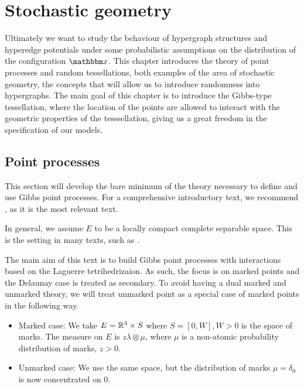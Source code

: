 \chapter{Stochastic geometry}
Ultimately we want to study the behaviour of hypergraph structures and hyperedge potentials under some probabilistic assumptions on the distribution of the configuration $\x$. This chapter introduces the theory of point processes and random tessellations, both examples of the area of stochastic geometry, the concepts that will allow us to introduce randomness into hypergraphs. The main goal of this chapter is to introduce the Gibbs-type tessellation, where the location of the points are allowed to interact with the geometric properties of the tesssellation, giving us a great freedom in the specification of our models.

\section{Point processes}
This section will develop the bare minimum of the theory necessary to define and use Gibbs point processes. For a comprehensive introductory text, we recommend \cite{MollerWaagepetersen2003}, as it is the most relevant text. 


In general, we assume $E$ to be a locally compact complete separable space. This is the setting in many texts, such as \cite{SchneiderWeil2008}.

The main aim of this text is to build Gibbs point processes with interactions based on the Laguerre tetrihedrizaion. As such, the focus is on marked points and the Delaunay case is treated as secondary. To avoid having a dual marked and unmarked theory, we will treat unmarked point as a special case of marked points in the following way. 

\begin{itemize}
	\item Marked case: We take $E={\mathbb R^3}\times S$ where $S=[0,W],W>0$ is the space of marks. The measure on $E$ is $z\lambda \otimes \mu$, where $\mu$ is a non-atomic probability distribution of marks, $z>0$. 
	\item Unmarked case: We use the same space, but the distribution of marks $\mu=\delta_0$ is now concentrated on $0$.
\end{itemize}


